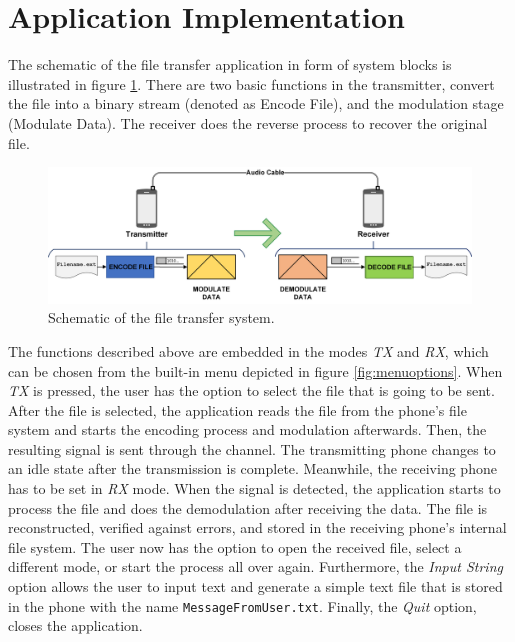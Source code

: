 \documentclass[12pt,a4paper,openright]{report}
\begin{document}
\section{Application Implementation} %

The schematic of the file transfer application in form of system blocks is illustrated in figure \ref{fig:SchematicsSystem}. There are two basic functions in the transmitter, convert the file into a binary stream (denoted as Encode File), and the modulation stage (Modulate Data). The receiver does the reverse process to recover the original file. 

 \begin{figure}[H]
  \centering
    \includegraphics[width=1\textwidth]{FullSystem.png}
    \caption[Schematic of the file transfer system]{Schematic of the file transfer system.}
    \label{fig:SchematicsSystem}
\end{figure}

The functions described above are embedded in the modes \emph{TX} and \emph{RX}, which can be chosen from the built-in menu depicted in figure \ref{fig:menuoptions}. When \emph{TX} is pressed, the user has the option to select the file that is going to be sent. After the file is selected, the application reads the file from the phone's file system and starts the encoding process and modulation afterwards. Then, the resulting signal is sent through the channel. The transmitting phone changes to an idle state after the transmission is complete. Meanwhile, the receiving phone has to be set in \emph{RX} mode. When the signal is detected, the application starts to process the file and does the demodulation after receiving the data. The file is reconstructed, verified against errors, and stored in the receiving phone's internal file system. The user now has the option to open the received file, select a different mode, or start the process all over again. Furthermore, the \emph{Input String} option allows the user to input text and generate a simple text file that is stored in the phone with the name \texttt{MessageFromUser.txt}. Finally, the \emph{Quit} option, closes the application. 
\end{document}

